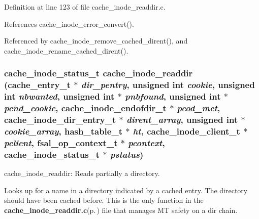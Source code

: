 Definition at line 123 of file cache\_\-inode\_\-readdir.c.

References cache\_\-inode\_\-error\_\-convert().

Referenced by cache\_\-inode\_\-remove\_\-cached\_\-dirent(), and cache\_\-inode\_\-rename\_\-cached\_\-dirent().
\subsubsection{\setlength{\rightskip}{0pt plus 5cm}cache\_\-inode\_\-status\_\-t cache\_\-inode\_\-readdir (cache\_\-entry\_\-t $\ast$ {\em dir\_\-pentry}, unsigned int {\em cookie}, unsigned int {\em nbwanted}, unsigned int $\ast$ {\em pnbfound}, unsigned int $\ast$ {\em pend\_\-cookie}, cache\_\-inode\_\-endofdir\_\-t $\ast$ {\em peod\_\-met}, cache\_\-inode\_\-dir\_\-entry\_\-t $\ast$ {\em dirent\_\-array}, unsigned int $\ast$ {\em cookie\_\-array}, hash\_\-table\_\-t $\ast$ {\em ht}, cache\_\-inode\_\-client\_\-t $\ast$ {\em pclient}, fsal\_\-op\_\-context\_\-t $\ast$ {\em pcontext}, cache\_\-inode\_\-status\_\-t $\ast$ {\em pstatus})}\label{cache__inode__readdir_8c_a5}


cache\_\-inode\_\-readdir: Reads partially a directory.

Looks up for a name in a directory indicated by a cached entry. The directory should have been cached before. This is the only function in the {\bf cache\_\-inode\_\-readdir.c}{\rm (p.\,\pageref{cache__inode__readdir_8c})} file that manages MT safety on a dir chain.

